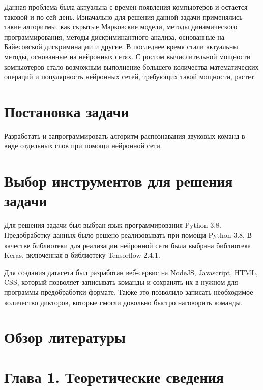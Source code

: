 \documentclass[14pt]{article}
\begin{document}
    Данная проблема была актуальна с времен появления компьютеров и остается таковой и по сей день. Изначально для решения данной задачи применялись такие алгоритмы, как скрытые Марковские модели, методы динамического программирования, методы дискриминантного анализа, основанные на Байесовской дискриминации и другие. В последнее время стали актуальны методы, основанные на нейронных сетях. С ростом вычислительной мощности компьютеров стало возможным выполнение большего количества математических операций и популярность нейронных сетей, требующих такой мощности, растет. 

\section*{Постановка задачи}
Разработать и запрограммировать алгоритм распознавания звуковых команд в виде отдельных слов при помощи нейронной сети.

\section*{Выбор инструментов для решения задачи}
Для решения задачи был выбран язык программирования Python 3.8. Предобработку данных было решено реализовывать при помощи Python 3.8.
В качестве библиотеки для реализации нейронной сети была выбрана библиотека Keras, включенная в библиотеку Tensorflow 2.4.1.

Для создания датасета был разработан веб-сервис на NodeJS, Javascript, HTML, CSS, который позволяет записывать команды и сохранять их в нужном для программы предобработки формате. Также это позволило записать необходимое количество дикторов, которые смогли довольно быстро наговорить команды.
\newpage

\section*{Обзор литературы}
\newpage

\section*{Глава 1. Теоретические сведения}
\newpage

\end{document}
